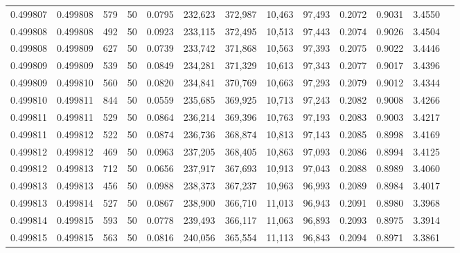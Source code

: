 \begin{tabular}{rrrrrrrrrrrrr}
0.499807 & 0.499808 &   579 &  50 &                                     0.0795 & 232,623 & 372,987 &  10,463 &  97,493 & 0.2072 & 0.9031 & 3.4550 \\
0.499808 & 0.499808 &   492 &  50 &                                     0.0923 & 233,115 & 372,495 &  10,513 &  97,443 & 0.2074 & 0.9026 & 3.4504 \\
0.499808 & 0.499809 &   627 &  50 &                                     0.0739 & 233,742 & 371,868 &  10,563 &  97,393 & 0.2075 & 0.9022 & 3.4446 \\
0.499809 & 0.499809 &   539 &  50 &                                     0.0849 & 234,281 & 371,329 &  10,613 &  97,343 & 0.2077 & 0.9017 & 3.4396 \\
0.499809 & 0.499810 &   560 &  50 &                                     0.0820 & 234,841 & 370,769 &  10,663 &  97,293 & 0.2079 & 0.9012 & 3.4344 \\
0.499810 & 0.499811 &   844 &  50 &                                     0.0559 & 235,685 & 369,925 &  10,713 &  97,243 & 0.2082 & 0.9008 & 3.4266 \\
0.499811 & 0.499811 &   529 &  50 &                                     0.0864 & 236,214 & 369,396 &  10,763 &  97,193 & 0.2083 & 0.9003 & 3.4217 \\
0.499811 & 0.499812 &   522 &  50 &                                     0.0874 & 236,736 & 368,874 &  10,813 &  97,143 & 0.2085 & 0.8998 & 3.4169 \\
0.499812 & 0.499812 &   469 &  50 &                                     0.0963 & 237,205 & 368,405 &  10,863 &  97,093 & 0.2086 & 0.8994 & 3.4125 \\
0.499812 & 0.499813 &   712 &  50 &                                     0.0656 & 237,917 & 367,693 &  10,913 &  97,043 & 0.2088 & 0.8989 & 3.4060 \\
0.499813 & 0.499813 &   456 &  50 &                                     0.0988 & 238,373 & 367,237 &  10,963 &  96,993 & 0.2089 & 0.8984 & 3.4017 \\
0.499813 & 0.499814 &   527 &  50 &                                     0.0867 & 238,900 & 366,710 &  11,013 &  96,943 & 0.2091 & 0.8980 & 3.3968 \\
0.499814 & 0.499815 &   593 &  50 &                                     0.0778 & 239,493 & 366,117 &  11,063 &  96,893 & 0.2093 & 0.8975 & 3.3914 \\
0.499815 & 0.499815 &   563 &  50 &                                     0.0816 & 240,056 & 365,554 &  11,113 &  96,843 & 0.2094 & 0.8971 & 3.3861 \\

\end{tabular}
